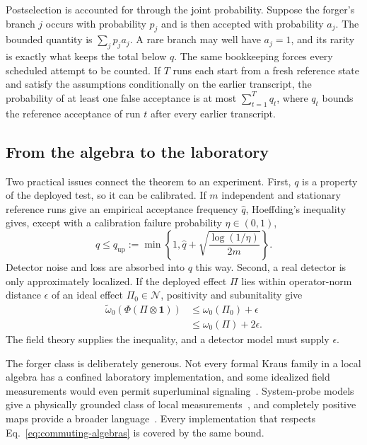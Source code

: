 \documentclass[11pt,a4paper]{article}
\newcommand{\N}{\mathcal{N}}
\begin{document}
Postselection is accounted for through the joint probability. Suppose the forger's branch $j$ occurs with probability $p_j$ and is then accepted with probability $a_j$. The bounded quantity is $\sum_jp_ja_j$. A rare branch may well have $a_j=1$, and its rarity is exactly what keeps the total below $q$. The same bookkeeping forces every scheduled attempt to be counted. If $T$ runs each start from a fresh reference state and satisfy the assumptions conditionally on the earlier transcript, the probability of at least one false acceptance is at most $\sum_{t=1}^Tq_t$, where $q_t$ bounds the reference acceptance of run $t$ after every earlier transcript.

\subsection{From the algebra to the laboratory}

Two practical issues connect the theorem to an experiment. First, $q$ is a property of the deployed test, so it can be calibrated. If $m$ independent and stationary reference runs give an empirical acceptance frequency $\widehat q$, Hoeffding's inequality gives, except with a calibration failure probability $\eta\in(0,1)$,
\begin{equation}
q\le q_{\mathrm{up}}
:=\min\!\left\{1,\widehat q+
\sqrt{\frac{\log(1/\eta)}{2m}}\right\}.
\label{eq:calibration}
\end{equation}
Detector noise and loss are absorbed into $q$ this way. Second, a real detector is only approximately localized. If the deployed effect $\Pi$ lies within operator-norm distance $\epsilon$ of an ideal effect $\Pi_0\in\N$, positivity and subunitality give
\begin{equation}
\begin{split}
\widetilde\omega_0\!\left(\Phi(\Pi\otimes\mathbf{1})\right)
&\le\omega_0(\Pi_0)+\epsilon\\
&\le\omega_0(\Pi)+2\epsilon.
\end{split}
\label{eq:approx-locality}
\end{equation}
The field theory supplies the inequality, and a detector model must supply $\epsilon$.

The forger class is deliberately generous. Not every formal Kraus family in a local algebra has a confined laboratory implementation, and some idealized field measurements would even permit superluminal signaling~\cite{sorkin1993impossible,jubb2022causal}. System-probe models give a physically grounded class of local measurements~\cite{fewster2020measurement,bostelmann2021impossible}, and completely positive maps provide a broader language~\cite{kitajima2018local}. Every implementation that respects Eq.~\eqref{eq:commuting-algebras} is covered by the same bound.
\end{document}
